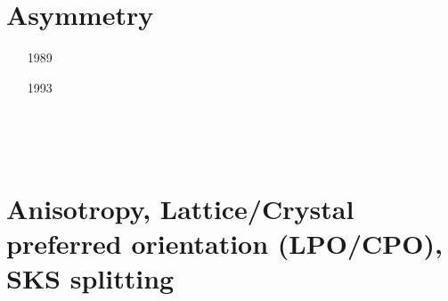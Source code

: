 \section{Asymmetry}
\label{sec:topics:asymmetry}

\begin{scriptsize}
\begin{itemize}
\item[1989]
\item[1993]
\item[\twothousandthree]
\item[\twothousandsix]
\item[\twothousandeight]
 \\ 
\item[\twothousandeleven]
\item[\twothousandfourteen]
  \\
\item[\twothousandfifteen]
\item[\twothousandsixteen]
\end{itemize}
\end{scriptsize}


\section{Anisotropy, Lattice/Crystal preferred orientation (LPO/CPO), SKS splitting}
\label{sec:topics:anisotropy}


